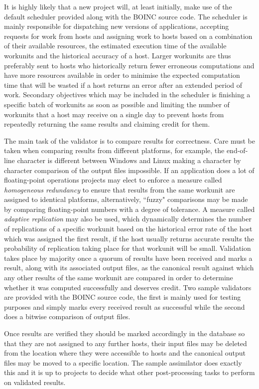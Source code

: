 It is highly likely that a new project will, at least initially, make use of the default scheduler  provided along  with the BOINC source code.
The scheduler is  mainly responsible for dispatching new versions of applications, accepting requests for work from hosts and assigning work to hosts based on a combination of their available resources, the estimated execution time of the available workunits and the historical accuracy of a host. Larger workunits are thus preferably sent to hosts who historically return fewer erroneous computations and have more resources available in order to minimise the expected computation time that will be wasted if a host returns an error after an extended period of   work.
Secondary objectives which may be included in the scheduler is finishing a specific batch of workunits as soon as possible and limiting the number of workunits that a host may receive on a single day to prevent hosts from repeatedly returning the same results and claiming credit for them.

The main task of the validator is to compare results for correctness. Care must be taken when comparing results from different platforms, for example, the end-of-line character is different between Windows and Linux making a character by character comparison of the output files impossible. If an application does a lot of floating-point operations projects may elect to enforce a measure called \emph{homogeneous redundancy} to ensure that results from the same workunit are assigned to identical platforms, alternatively,  ``fuzzy" comparisons may be made by comparing floating-point numbers with a degree of tolerance. A measure called \emph{adaptive replication} may also be used, which dynamically determines the number of replications of a specific workunit based on the historical error rate of the host which was assigned the first result, if the host usually returns accurate results the probability of replication taking place for that workunit will be small.
Validation takes place by majority once a quorum of results have been received and marks a result, along with its associated output files, as the canonical result against which any other results of the same workunit are compared in order to determine whether it was computed successfully and deserves credit.
Two sample validators are provided with the BOINC source code, the first is mainly used for testing purposes and simply marks every received result as successful while the second does a bitwise comparison of output files.

Once results are verified they should be marked accordingly in the database so that they are not assigned to any further hosts, their input files may be deleted from the location where they were accessible to hosts and the canonical output files may be moved to a specific location.
The sample assimilator does exactly this and it is up to projects to decide what other post-processing tasks to perform on validated results.

